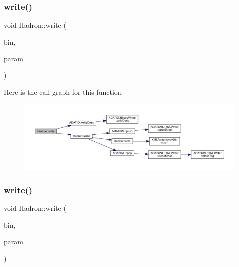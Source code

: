 \subsubsection{\texorpdfstring{write()}{write()}\hspace{0.1cm}{\footnotesize\ttfamily [78/95]}}
{\footnotesize\ttfamily void Hadron\+::write (\begin{DoxyParamCaption}\item[{\mbox{\hyperlink{classADATIO_1_1BinaryWriter}{Binary\+Writer}} \&}]{bin,  }\item[{const \mbox{\hyperlink{structHadron_1_1KeyHadronSUNNPartIrrepOp__t_1_1CGPair__t_1_1Slot__t}{Key\+Hadron\+S\+U\+N\+N\+Part\+Irrep\+Op\+\_\+t\+::\+C\+G\+Pair\+\_\+t\+::\+Slot\+\_\+t}} \&}]{param }\end{DoxyParamCaption})}

Here is the call graph for this function\+:
\nopagebreak
\begin{figure}[H]
\begin{center}
\leavevmode
\includegraphics[width=350pt]{d1/daf/namespaceHadron_ad5c8dc860360f98655b29f17b61f2a35_cgraph}
\end{center}
\end{figure}
\mbox{\label{namespaceHadron_a4beaf6ce4a67fc85ae046f257141250e}} 
\subsubsection{\texorpdfstring{write()}{write()}\hspace{0.1cm}{\footnotesize\ttfamily [79/95]}}
{\footnotesize\ttfamily void Hadron\+::write (\begin{DoxyParamCaption}\item[{\mbox{\hyperlink{classADATIO_1_1BinaryWriter}{Binary\+Writer}} \&}]{bin,  }\item[{const \mbox{\hyperlink{structHadron_1_1KeyHadronNPartIrrepOp__t_1_1CGPair__t_1_1Slot__t}{Key\+Hadron\+N\+Part\+Irrep\+Op\+\_\+t\+::\+C\+G\+Pair\+\_\+t\+::\+Slot\+\_\+t}} \&}]{param }\end{DoxyParamCaption})}


